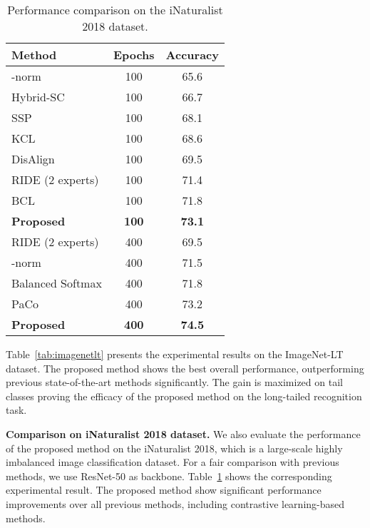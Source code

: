 \documentclass{article}
\theoremstyle{plain}
\theoremstyle{definition}
\theoremstyle{remark}
\begin{document}
\begin{table}[t]
\centering
\caption{Performance comparison on the iNaturalist 2018 dataset.}
\begin{tabular}{l|c|c}
\hline
Method                                  & Epochs       & Accuracy      \\ \hline
-norm   & 100          & 65.6          \\
Hybrid-SC    & 100          & 66.7          \\
SSP           & 100          & 68.1          \\
KCL            & 100          & 68.6          \\
DisAlign   & 100          & 69.5          \\
RIDE (2 experts)    & 100          & 71.4          \\
BCL              & 100          & 71.8          \\
\textbf{Proposed}                       & \textbf{100} & \textbf{73.1} \\ \hline
RIDE (2 experts)    & 400          & 69.5          \\
-norm   & 400          & 71.5          \\
Balanced Softmax & 400          & 71.8          \\
PaCo           & 400          & 73.2          \\
\textbf{Proposed}                       & \textbf{400} & \textbf{74.5} \\ \hline
\end{tabular}

%
 \label{tab:inaturalist}
\end{table}
Table~\ref{tab:imagenetlt} presents the experimental results on the ImageNet-LT dataset. The proposed method shows the best overall performance, outperforming previous state-of-the-art methods significantly. The gain is maximized on tail classes proving the efficacy of the proposed method on the long-tailed recognition task.

\textbf{Comparison on iNaturalist 2018 dataset.} We also evaluate the performance of the proposed method on the iNaturalist 2018, which is a large-scale highly imbalanced image classification dataset. For a fair comparison with previous methods, we use ResNet-50 as backbone. Table~\ref{tab:inaturalist} shows the corresponding experimental result. The proposed method show significant performance improvements over all previous methods, including contrastive learning-based methods.
\end{document}
